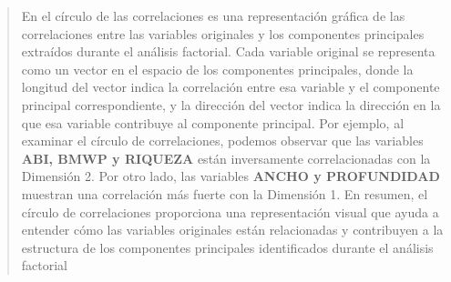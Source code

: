 \documentclass[
  10pt,
  letterpaper,
  DIV=11,
  numbers=noendperiod]{scrreprt}
\begin{document}
\begin{quote}
En el círculo de las correlaciones es una representación gráfica de las
correlaciones entre las variables originales y los componentes
principales extraídos durante el análisis factorial. Cada variable
original se representa como un vector en el espacio de los componentes
principales, donde la longitud del vector indica la correlación entre
esa variable y el componente principal correspondiente, y la dirección
del vector indica la dirección en la que esa variable contribuye al
componente principal. Por ejemplo, al examinar el círculo de
correlaciones, podemos observar que las variables \textbf{ABI, BMWP y
RIQUEZA} están inversamente correlacionadas con la Dimensión 2. Por otro
lado, las variables \textbf{ANCHO y PROFUNDIDAD} muestran una
correlación más fuerte con la Dimensión 1. En resumen, el círculo de
correlaciones proporciona una representación visual que ayuda a entender
cómo las variables originales están relacionadas y contribuyen a la
estructura de los componentes principales identificados durante el
análisis factorial
\end{quote}
\end{document}
